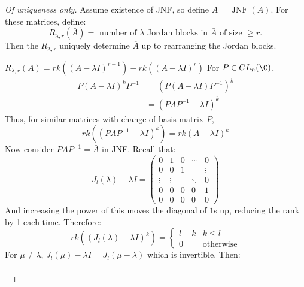 \documentclass[../Main.tex]{subfiles}
\begin{document}
\begin{proof}[Of uniqueness only]
    Assume existence of JNF, so define $\bar{A} = \operatorname{JNF}(A)$. For these matrices, define:
    \begin{equation*}
        R_{\lambda, r}(\bar{A}) = \text{ number of $\lambda$ Jordan blocks in $\bar{A}$ of size $\geq r$.}
    \end{equation*}
    Then the $R_{\lambda, r}$ uniquely determine $\overline{A}$ up to rearranging the Jordan blocks.
    \begin{subproof}{$R_{\lambda, r}(A) = rk((A - \lambda I)^{r-1}) - rk((A - \lambda I)^r)$}
        For $P \in GL_n(\C)$,
        \begin{align*}
            P(A - \lambda I)^k P^{-1} &= (P(A - \lambda I)P^{-1})^k \\
            &= (PAP^{-1} - \lambda I)^k
        \end{align*}
        Thus, for similar matrices with change-of-basis matrix $P$,
        \begin{equation*}
            rk((PAP^{-1} - \lambda I)^k) = rk(A - \lambda I)^k
        \end{equation*}
        Now consider $PAP^{-1} = \bar{A}$ in JNF.
        Recall that:
        \begin{equation*}
            J_l(\lambda) - \lambda I = 
            \begin{pmatrix}
                0 & 1 & 0 & \cdots & 0 \\
                0 & 0 & 1 & & \vdots \\
                \vdots & \vdots & & \ddots & 0 \\
                0 & 0 & 0 & 0 & 1 \\
                0 & 0 & 0 & 0 & 0
            \end{pmatrix}
        \end{equation*}
        And increasing the power of this moves the diagonal of $1$s up, reducing the rank by 1 each time. Therefore:
        \begin{equation*}
            rk((J_l(\lambda) - \lambda I)^k) =
            \begin{cases}
                l - k & k \leq l \\
                0 & \text{otherwise}
            \end{cases}
        \end{equation*}
        For $\mu \neq \lambda$, $J_l(\mu) - \lambda I = J_l(\mu - \lambda)$ which is invertible. Then:
        \begin{align*}

\end{align*}
\end{subproof}
\end{proof}
\end{document}
